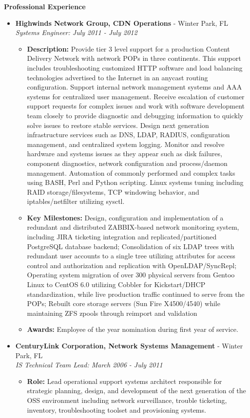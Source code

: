 \documentclass[10pt,oneside]{article}
\newenvironment{ressection}[1]{
  \vspace{4pt}
  \textbf{\selectfont\normalsize#1}
  \begin{itemize}
  \vspace{3pt}
}{
  \end{itemize}
}
\newcommand{\ressubitem}[1]{
  \vspace{-1pt}
  \item \begin{flushleft} #1 \end{flushleft}
}
\newcommand{\resbigitem}[3]{
  \vspace{-5pt}
  \item
  \textbf{#1} - #2 \\
  \textit{#3}
}
\newenvironment{ressubsec}[3]{
  \resbigitem{#1}{#2}{#3}
  \vspace{-2pt}
  \begin{itemize}
}{
  \end{itemize}
}
\begin{document}
\begin{ressection}{Professional Experience}
\begin{ressubsec}{Highwinds Network Group, CDN Operations}{Winter Park, FL}{Systems Engineer: July 2011 - July 2012}
    \ressubitem{\textbf{Description:} Provide tier 3 level support for a production Content Delivery Network with network POPs in three continents. This support includes troubleshooting customized HTTP software and load balancing technologies advertised to the Internet in an anycast routing configuration. Support internal network management systems and AAA systems for centralized user management. Receive escalation of customer support requests for complex issues and work with software development team closely to provide diagnostic and debugging information to quickly solve issues to restore stable services. Design next generation infrastructure services such as DNS, LDAP, RADIUS, configuration management, and centralized system logging. Monitor and resolve hardware and systems issues as they appear such as disk failures, component diagnostics, network configuration and process/daemon management. Automation of commonly performed and complex tasks using BASH, Perl and Python scripting. Linux systems tuning including RAID storage/filesystems, TCP windowing behavior, and iptables/netfilter utilizing sysctl.}

    \ressubitem{\textbf{Key Milestones:} Design, configuration and implementation of a redundant and distributed ZABBIX-based network monitoring system, including JIRA ticketing integration and replicated/partitioned PostgreSQL database backend; Consolidation of six LDAP trees with redundant user accounts to a single tree utilizing attributes for access control and authorization and replication with OpenLDAP/SyncRepl; Operating system migration of over 300 physical servers from Gentoo Linux to CentOS 6.0 utilizing Cobbler for Kickstart/DHCP standardization, while live production traffic continued to serve from the POPs; Rebuilt core storage servers (Sun Fire X4500/4540) while maintaining ZFS zpools through reimport and validation}

    \ressubitem{\textbf{Awards:} Employee of the year nomination during first year of service.}

  \end{ressubsec}

  \begin{ressubsec}{CenturyLink Corporation, Network Systems Management}{Winter Park, FL}{IS Technical Team Lead: March 2006 - July 2011}

    \ressubitem{\textbf{Role:} Lead operational support systems architect responsible for strategic planning, design, and development of the next generation of the OSS environment including network surveillance, trouble ticketing, inventory, troubleshooting toolset and provisioning systems.}
    

\end{ressubsec}
\end{ressection}
\end{document}
